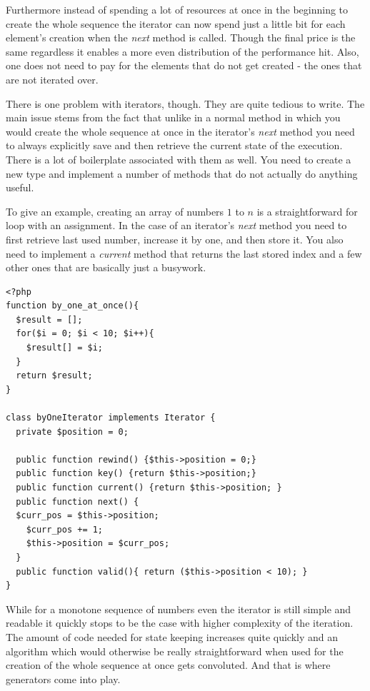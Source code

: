 Furthermore instead of spending a lot of resources at once in the beginning to create the whole sequence the iterator can now spend just a little bit for each element’s creation when the \emph{next} method is called. Though the final price is the same regardless it enables a more even distribution of the performance hit. Also, one does not need to pay for the elements that do not get created - the ones that are not iterated over.

There is one problem with iterators, though. They are quite tedious to write. The main issue stems from the fact that unlike in a normal method in which you would create the whole sequence at once in the iterator’s \emph{next} method you need to always explicitly save and then retrieve the current state of the execution. There is a lot of boilerplate associated with them as well. You need to create a new type and implement a number of methods that do not actually do anything useful.

To give an example, creating an array of numbers $1$ to $n$ is a straightforward for loop with an assignment. In the case of an iterator’s \emph{next} method you need to first retrieve last used number, increase it by one, and then store it. You also need to implement a \emph{current} method that returns the last stored index and a few other ones that are basically just a busywork. 

\begin{verbatim}
<?php
function by_one_at_once(){
  $result = [];
  for($i = 0; $i < 10; $i++){
    $result[] = $i;
  }
  return $result;
}

class byOneIterator implements Iterator {
  private $position = 0;

  public function rewind() {$this->position = 0;}
  public function key() {return $this->position;}
  public function current() {return $this->position; }
  public function next() {
  $curr_pos = $this->position;
    $curr_pos += 1;
    $this->position = $curr_pos;
  }
  public function valid(){ return ($this->position < 10); }
}
\end{verbatim}

While for a monotone sequence of numbers even the iterator is still simple and readable it quickly stops to be the case with higher complexity of the iteration. The amount of code needed for state keeping increases quite quickly and an algorithm which would otherwise be really straightforward when used for the creation of the whole sequence at once gets convoluted. And that is where generators come into play.


